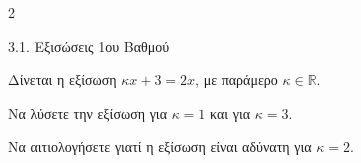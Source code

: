 \begin{ylh}{2}
    \item 3.1. Εξισώσεις 1ου Βαθμού
\end{ylh}
Δίνεται η εξίσωση $\kappa x + 3 = 2x$, με παράμερο $\kappa \in \mathbb{R}$.

\begin{alist}
\item Να λύσετε την εξίσωση για $\kappa = 1$ και για $\kappa = 3$.
\item Να αιτιολογήσετε γιατί η εξίσωση είναι αδύνατη για $\kappa = 2$.
\end{alist}

